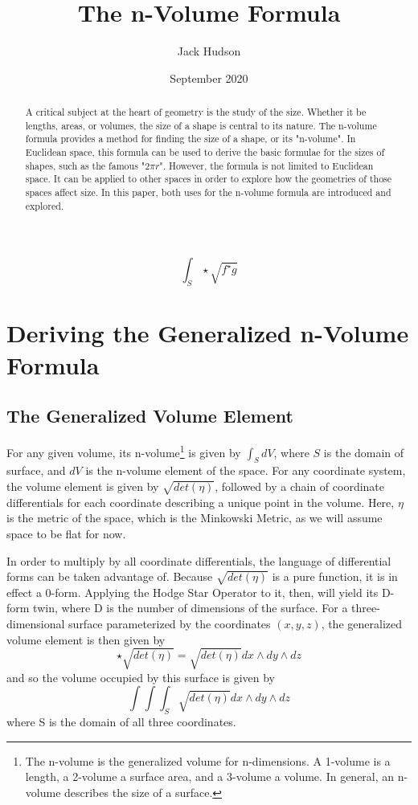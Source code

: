 \documentclass{article}
\title{The n-Volume Formula}
\author{Jack Hudson}
\date{September 2020}
\begin{document}
\maketitle

\[
\int_S \star \sqrt{f^{\star}g}
\]

\begin{abstract}
    A critical subject at the heart of geometry is the study of the size. Whether it be lengths, areas, or volumes, the size of a shape is central to its nature. The n-volume formula provides a method for finding the size of a shape, or its "n-volume". In Euclidean space, this formula can be used to derive the basic formulae for the sizes of shapes, such as the famous "$2\pi r$". However, the formula is not limited to Euclidean space. It can be applied to other spaces in order to explore how the geometries of those spaces affect size. In this paper, both uses for the n-volume formula are introduced and explored.
\end{abstract}

\newpage
\tableofcontents
\newpage

\section{Deriving the Generalized n-Volume Formula}
\subsection{The Generalized Volume Element}
For any given volume, its n-volume\footnote{The n-volume is the generalized volume for n-dimensions. A 1-volume is a length, a 2-volume a surface area, and a 3-volume a volume. In general, an n-volume describes the size of a surface.} is given by $\int_S dV$, where $S$ is the domain of surface, and $dV$ is the n-volume element of the space. For any coordinate system, the volume element is given by $\sqrt{det(\eta)}$, followed by a chain of coordinate differentials for each coordinate describing a unique point in the volume. Here, $\eta$ is the metric of the space, which is the Minkowski Metric, as we will assume space to be flat for now.

In order to multiply by all coordinate differentials, the language of differential forms can be taken advantage of. Because $\sqrt{det(\eta)}$ is a pure function, it is in effect a 0-form. Applying the Hodge Star Operator to it, then, will yield its D-form twin, where D is the number of dimensions of the surface. For a three-dimensional surface parameterized by the coordinates $(x,y,z)$, the generalized volume element is then given by
\[
\star \sqrt{det(\eta)} = \sqrt{det(\eta)} dx \wedge dy \wedge dz
\]
and so the volume occupied by this surface is given by
\[
\int\int\int_S \sqrt{det(\eta)} dx \wedge dy \wedge dz
\]
where S is the domain of all three coordinates.
\end{document}

